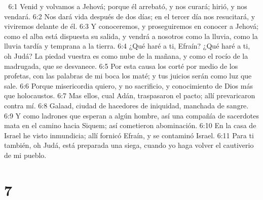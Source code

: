 
6:1 Venid y volvamos a Jehová; porque él arrebató, y nos curará; hirió, y nos vendará.  
6:2 Nos dará vida después de dos días; en el tercer día nos resucitará, y viviremos delante de él.  
6:3 Y conoceremos, y proseguiremos en conocer a Jehová; como el alba está dispuesta su salida, y vendrá a nosotros como la lluvia, como la lluvia tardía y temprana a la tierra.  
6:4 ¿Qué haré a ti, Efraín? ¿Qué haré a ti, oh Judá? La piedad vuestra es como nube de la mañana, y como el rocío de la madrugada, que se desvanece.  
6:5 Por esta causa los corté por medio de los profetas, con las palabras de mi boca los maté; y tus juicios serán como luz que sale.  
6:6 Porque misericordia quiero, y no sacrificio, y conocimiento de Dios más que holocaustos.  
6:7 Mas ellos, cual Adán, traspasaron el pacto; allí prevaricaron contra mí.  
6:8 Galaad, ciudad de hacedores de iniquidad, manchada de sangre.  
6:9 Y como ladrones que esperan a algún hombre, así una compañía de sacerdotes mata en el camino hacia Siquem; así cometieron abominación.  
6:10 En la casa de Israel he visto inmundicia; allí fornicó Efraín, y se contaminó Israel.  
6:11 Para ti también, oh Judá, está preparada una siega, cuando yo haga volver el cautiverio de mi pueblo.  

\chapter{7}

